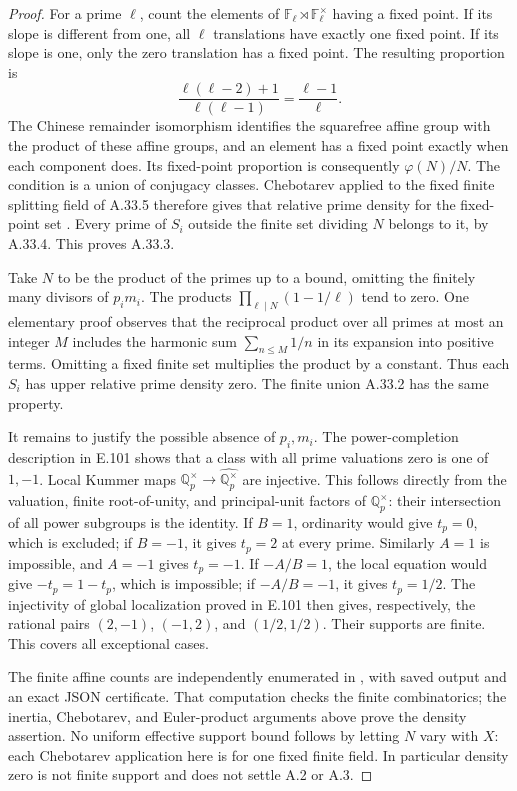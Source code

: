 \begin{proof}
For a prime \(\ell\), count the elements of
\(\mathbb F_\ell\rtimes\mathbb F_\ell^\times\) having a fixed
point.  If its slope is different from one, all \(\ell\) translations
have exactly one fixed point.  If its slope is one, only the zero
translation has a fixed point.  The resulting proportion is
\[
 \frac{\ell(\ell-2)+1}{\ell(\ell-1)}
                  =\frac{\ell-1}{\ell}.
\tag{A.33.6}
\]
The Chinese remainder isomorphism identifies the squarefree affine
group with the product of these affine groups, and an element has
a fixed point exactly when each component does.  Its fixed-point
proportion is consequently \(\varphi(N)/N\).
The condition is a union of conjugacy classes.  Chebotarev applied
to the fixed finite splitting field of A.33.5 therefore gives that
relative prime density for the fixed-point set
\citep[Theorem~8.31, printed p.~147]{CohMilneANT}.
Every prime of \(S_i\) outside the finite set dividing \(N\)
belongs to it, by A.33.4.  This proves A.33.3.

Take \(N\) to be the product of the primes up to a bound, omitting
the finitely many divisors of \(p_i m_i\).
The products \(\prod_{\ell\mid N}(1-1/\ell)\) tend to zero.
One elementary proof observes that the reciprocal product over
all primes at most an integer \(M\) includes the harmonic sum
\(\sum_{n\le M}1/n\) in its expansion into positive terms.
Omitting a fixed finite set multiplies the product by a constant.
Thus each \(S_i\) has upper relative prime density zero.
The finite union A.33.2 has the same property.

It remains to justify the possible absence of \(p_i,m_i\).
The power-completion description in E.101 shows that a class with
all prime valuations zero is one of \(1,-1\).
Local Kummer maps \(\mathbb Q_p^\times\to\widehat{\mathbb Q_p^\times}\)
are injective.  This follows directly from the valuation, finite
root-of-unity, and principal-unit factors of \(\mathbb Q_p^\times\):
their intersection of all power subgroups is the identity.
If \(B=1\), ordinarity would give \(t_p=0\), which is excluded;
if \(B=-1\), it gives \(t_p=2\) at every prime.
Similarly \(A=1\) is impossible, and \(A=-1\) gives \(t_p=-1\).
If \(-A/B=1\), the local equation would give
\(-t_p=1-t_p\), which is impossible; if \(-A/B=-1\), it gives
\(t_p=1/2\).  The injectivity of global localization proved in
E.101 then gives, respectively, the rational pairs
\((2,-1)\), \((-1,2)\), and \((1/2,1/2)\).
Their supports are finite.  This covers all exceptional cases.

The finite affine counts are independently enumerated in
, with saved output and an exact
JSON certificate.  That computation checks the finite combinatorics;
the inertia, Chebotarev, and Euler-product arguments above prove the
density assertion.  No uniform effective support bound follows by
letting \(N\) vary with \(X\): each Chebotarev application here is
for one fixed finite field.  In particular density zero is not
finite support and does not settle A.2 or A.3.
\end{proof}
